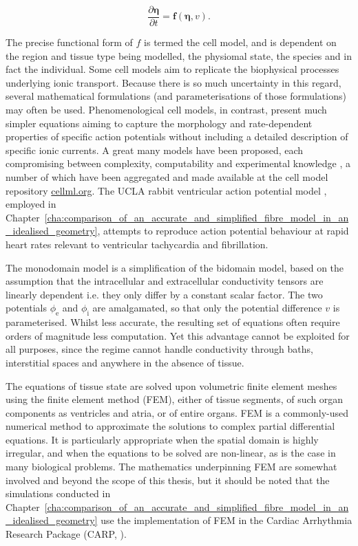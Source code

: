  \begin{equation}
    \frac{\partial \boldsymbol\eta}{\partial t} = \mathbf{f}\left(\boldsymbol\eta, v \right).
  \end{equation}
  
  The precise functional form of $f$ is termed the cell model, and is dependent on the region and tissue type being modelled, the physiomal state, the species and in fact the individual. Some cell models aim to replicate the biophysical processes underlying ionic transport. Because there is so much uncertainty in this regard, several mathematical formulations (and parameterisations of those formulations) may often be used. Phenomenological cell models, in contrast, present much simpler equations aiming to capture the morphology and rate-dependent properties of specific action potentials without including a detailed description of specific ionic currents. A great many models have been proposed, each compromising between complexity, computability and experimental knowledge \cite{Noble2011,Carusi2012}, a number of which have been aggregated and made available at the cell model repository \url{cellml.org}. The UCLA rabbit ventricular action potential model \cite{Mahajan2008}, employed in Chapter~\ref{cha:comparison_of_an_accurate_and_simplified_fibre_model_in_an_idealised_geometry}, attempts to reproduce action potential behaviour at rapid heart rates relevant to ventricular tachycardia and fibrillation.
  
  The monodomain model is a simplification of the bidomain model, based on the assumption that the intracellular and extracellular conductivity tensors are linearly dependent i.e. they only differ by a constant scalar factor. The two potentials $\phi_\text{e}$ and $\phi_\text{i}$ are amalgamated, so that only the potential difference $v$ is parameterised. Whilst less accurate, the resulting set of equations often require orders of magnitude less computation. Yet this advantage cannot be exploited for all purposes, since the regime cannot handle conductivity through baths, interstitial spaces and anywhere in the absence of tissue.
  
  The equations of tissue state are solved upon volumetric finite element meshes using the finite element method (FEM), either of tissue segments, of such organ components as ventricles and atria, or of entire organs. FEM is a commonly-used numerical method to approximate the solutions to complex partial differential equations. It is particularly appropriate when the spatial domain is highly irregular, and when the equations to be solved are non-linear, as is the case in many biological problems. The mathematics underpinning FEM are somewhat involved and beyond the scope of this thesis, but it should be noted that the simulations conducted in Chapter~\ref{cha:comparison_of_an_accurate_and_simplified_fibre_model_in_an_idealised_geometry} use the implementation of FEM in the Cardiac Arrhythmia Research Package (CARP, \cite{Vigmond2003}).
  
